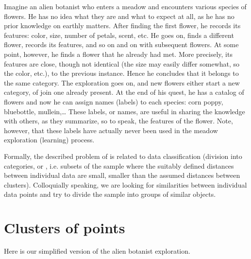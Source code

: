 \documentclass[a4paper,12pt,polish]{jupyterBook}
\begin{document}
\sphinxAtStartPar
Imagine an alien botanist who enters a meadow and encounters various species of flowers. He has no idea what they are and what to expect at all, as he has no prior knowledge on earthly matters. After finding the first flower, he records its features: color, size, number of petals, scent, etc. He goes on, finds a different flower, records its features, and so on and on with subsequent flowers. At some point, however, he finds a flower that he already had met. More precisely, its features are close, though not identical (the size may easily differ somewhat, so the color, etc.), to the previous instance. Hence he concludes that it belongs to the same category. The exploration goes on, and new flowers either start a new category, of join one already present. At the end of his quest, he has a catalog of flowers and now he can assign names (labels) to each species: corn poppy, bluebottle, mullein,…  These labels, or names, are useful in sharing the knowledge with others, as they summarize, so to speak, the features of the flower. Note, however, that these labels have actually never been used in the meadow exploration (learning) process.

\sphinxAtStartPar
Formally, the described problem of  is related to data classification (division into categories, or , i.e. subsets of the sample where the suitably defined distances between individual data are small, smaller than the assumed distances between clusters). Colloquially speaking, we are looking for similarities between individual data points and try to divide the sample into groups of similar objects.


\section{Clusters of points}
\label{\detokenize{docs/unsupervised:clusters-of-points}}
\sphinxAtStartPar
Here is our simplified version of the alien botanist exploration.
\end{document}
